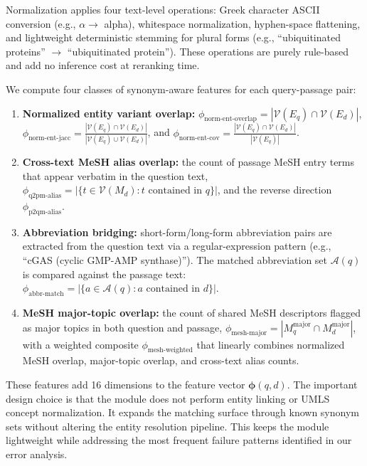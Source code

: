 Normalization applies four text-level operations: Greek character ASCII conversion (e.g., $\alpha \rightarrow$ alpha), whitespace normalization, hyphen-space flattening, and lightweight deterministic stemming for plural forms (e.g., ``ubiquitinated proteins'' $\rightarrow$ ``ubiquitinated protein''). These operations are purely rule-based and add no inference cost at reranking time.

We compute four classes of synonym-aware features for each query-passage pair:

\begin{enumerate}[leftmargin=*,nosep]
    \item \textbf{Normalized entity variant overlap:} $\phi_{\text{norm-ent-overlap}} = |\mathcal{V}(E_q) \cap \mathcal{V}(E_d)|$, $\phi_{\text{norm-ent-jacc}} = \frac{|\mathcal{V}(E_q) \cap \mathcal{V}(E_d)|}{|\mathcal{V}(E_q) \cup \mathcal{V}(E_d)|}$, and $\phi_{\text{norm-ent-cov}} = \frac{|\mathcal{V}(E_q) \cap \mathcal{V}(E_d)|}{|\mathcal{V}(E_q)|}$.
    \item \textbf{Cross-text MeSH alias overlap:} the count of passage MeSH entry terms that appear verbatim in the question text, $\phi_{\text{q2pm-alias}} = |\{t \in \mathcal{V}(M_d) : t \text{ contained in } q\}|$, and the reverse direction $\phi_{\text{p2qm-alias}}$.
    \item \textbf{Abbreviation bridging:} short-form/long-form abbreviation pairs are extracted from the question text via a regular-expression pattern (e.g., ``cGAS (cyclic GMP-AMP synthase)''). The matched abbreviation set $\mathcal{A}(q)$ is compared against the passage text: $\phi_{\text{abbr-match}} = |\{a \in \mathcal{A}(q) : a \text{ contained in } d\}|$.
    \item \textbf{MeSH major-topic overlap:} the count of shared MeSH descriptors flagged as major topics in both question and passage, $\phi_{\text{mesh-major}} = |M_q^{\text{major}} \cap M_d^{\text{major}}|$, with a weighted composite $\phi_{\text{mesh-weighted}}$ that linearly combines normalized MeSH overlap, major-topic overlap, and cross-text alias counts.
\end{enumerate}

These features add 16 dimensions to the feature vector $\boldsymbol{\phi}(q,d)$. The important design choice is that the module does not perform entity linking or UMLS concept normalization. It expands the matching surface through known synonym sets without altering the entity resolution pipeline. This keeps the module lightweight while addressing the most frequent failure patterns identified in our error analysis.

